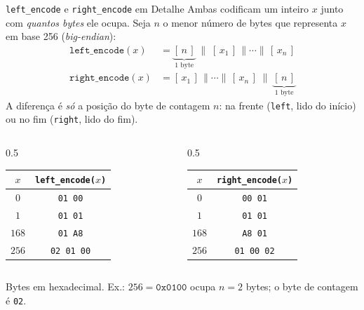 \documentclass{beamer}
\begin{document}
\begin{frame}{\texttt{left\_encode} e \texttt{right\_encode} em Detalhe}
    Ambas codificam um inteiro $x$ junto com \emph{quantos bytes} ele ocupa. Seja $n$ o menor número de bytes que representa $x$ em base 256 (\textit{big-endian}):
    \begin{align*}
        \texttt{left\_encode}(x)  &= \underbrace{[\,n\,]}_{\text{1 byte}} \;\|\; [\,x_1\,]\,\|\cdots\|\,[\,x_n\,] \\[2pt]
        \texttt{right\_encode}(x) &= [\,x_1\,]\,\|\cdots\|\,[\,x_n\,]\;\|\;\underbrace{[\,n\,]}_{\text{1 byte}}
    \end{align*}
    A diferença é \emph{só} a posição do byte de contagem $n$: na frente (\texttt{left}, lido do início) ou no fim (\texttt{right}, lido do fim).
    \medskip
    \begin{columns}[T]
        \begin{column}{0.5\textwidth}
            \centering\footnotesize
            \begin{tabular}{cc}
                \toprule
                $x$ & \texttt{left\_encode($x$)} \\
                \midrule
                $0$   & \texttt{01 00} \\
                $1$   & \texttt{01 01} \\
                $168$ & \texttt{01 A8} \\
                $256$ & \texttt{02 01 00} \\
                \bottomrule
            \end{tabular}
        \end{column}
        \begin{column}{0.5\textwidth}
            \centering\footnotesize
            \begin{tabular}{cc}
                \toprule
                $x$ & \texttt{right\_encode($x$)} \\
                \midrule
                $0$   & \texttt{00 01} \\
                $1$   & \texttt{01 01} \\
                $168$ & \texttt{A8 01} \\
                $256$ & \texttt{01 00 02} \\
                \bottomrule
            \end{tabular}
        \end{column}
    \end{columns}
    \smallskip
    {\footnotesize Bytes em hexadecimal. Ex.: $256 = \texttt{0x0100}$ ocupa $n=2$ bytes; o byte de contagem é \texttt{02}.}
\end{frame}
\end{document}
